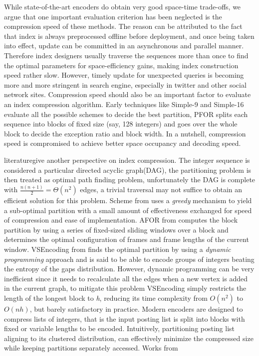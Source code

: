 \documentclass[runningheads,a4paper]{llncs}
\begin{document}
While state-of-the-art encoders do obtain very good space-time trade-offs, we argue that one important evaluation criterion has been neglected is the compression speed of these methods\cite{manning2008introduction,silvestri2010vsencoding,yan2009inverted}. The reason can be attributed to the fact that index is always preprocessed offline before deployment, and once being taken into effect, update can be committed in an asynchronous and parallel manner. Therefore index designers usually traverse the sequences more than once to find the optimal parameters for space-efficiency gains, making index construction speed rather slow. However, timely update for unexpected queries is becoming more and more stringent in search engine, especially in twitter and other social network sites. Compression speed should also be an important factor to evaluate an index compression algorithm. Early techniques like Simple-9 and Simple-16\cite{anh2005inverted,anh2010index} evaluate all the possible schemes to decide the best partition, PFOR\cite{lemire2015decoding,yan2009inverted,zobel2006inverted} splits each sequence into blocks of fixed size (say, 128 integers) and goes over the whole block to decide the exception ratio and block width. In a nutshell, compression speed is compromised to achieve better space occupancy and decoding speed.

literature\cite{anh2004index,delbru2010adaptive,silvestri2010vsencoding}give another perspective on index compression. The integer sequence is considered a particular directed acyclic graph(DAG), the partitioning problem is then treated as optimal path finding problem, unfortunately the DAG is complete with $ \frac{n\left( n+1\right)}{2} = \Theta\left( n^{2}\right) $ edges, a trivial traversal may not suffice to obtain an efficient solution for this problem. Scheme from \cite{anh2004index} uses a \textit{greedy} mechanism to yield a sub-optimal partition with a small amount of effectiveness exchanged for speed of compression and ease of implementation. AFOR from \cite{delbru2010adaptive} computes the block partition by using a series of fixed-sized sliding windows over a block and determines the optimal configuration of frames and frame lengths of the current window. VSEncoding from \cite{silvestri2010vsencoding} finds the optimal partition by using a \textit{dynamic programming} approach and is said to be able to encode groups of integers beating the entropy of the gaps distribution. However, dynamic programming can be very inefficient since it needs to recalculate all the edges when a new vertex is added in the current graph, to mitigate this problem VSEncoding simply restricts the length of the longest block to \textit{h}, reducing its time complexity from $O(n^{2})$ to $O(nh)$, but barely satisfactory in practice.
Modern encoders are designed to compress lists of integers, that is the input posting list is split into blocks with fixed or variable lengths to be encoded. Intuitively, partitioning posting list aligning to its clustered distribution, can effectively minimize the compressed size while keeping partitions separately accessed. Works from 
\end{document}
